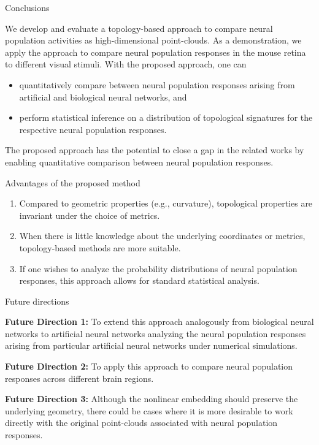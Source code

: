 \documentclass[xcolor={dvipsnames,svgnames}]{beamer}
\begin{document}
\begin{frame}{Conclusions}

We develop and evaluate a topology-based approach to compare neural population activities as high-dimensional point-clouds. As a demonstration, we apply the approach to compare neural population responses in the mouse retina to different visual stimuli. With the proposed approach, one can
\begin{itemize}
    \item quantitatively compare between neural population responses arising from artificial and biological neural networks, and 
    \item perform statistical inference on a distribution of topological signatures for the respective neural population responses.
\end{itemize}

    The proposed approach has the potential to close a gap in the related works by enabling quantitative comparison between neural population responses. 
 
\end{frame}
\begin{frame}{Advantages of the proposed method}
\begin{enumerate}	
    \item Compared to geometric properties (e.g., curvature), topological properties are invariant under the choice of metrics. 
    
	\item When there is little knowledge about the underlying coordinates or metrics, topology-based methods are more suitable.
	
	\item If one wishes to analyze the probability distributions of neural population responses, this approach allows for standard statistical analysis. 
	\end{enumerate}
\end{frame}

\begin{frame}{Future directions}
\item \textbf{Future Direction 1: }To extend this approach analogously from biological neural networks to artificial neural networks analyzing the neural population responses arising from particular artificial neural networks under numerical simulations. 
\item \textbf{Future Direction 2: }To apply this approach to compare neural population responses across different brain regions. 
\item \textbf{Future Direction 3: } Although the nonlinear embedding should preserve the underlying geometry, there could be cases where it is more desirable to work directly with the original point-clouds associated with neural population responses.
\end{frame}
\end{document}
